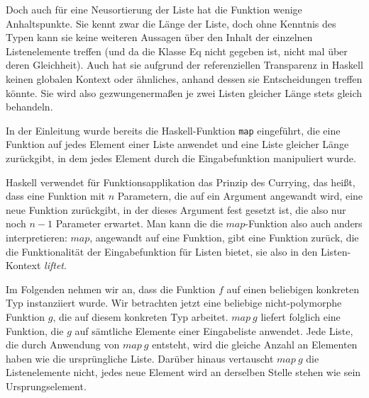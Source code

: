 Doch auch für eine Neusortierung der Liste hat die Funktion wenige Anhaltspunkte. Sie kennt zwar die Länge der Liste, doch ohne Kenntnis des Typen kann sie keine weiteren Aussagen über den Inhalt der einzelnen Listenelemente treffen (und da die Klasse Eq
nicht gegeben ist, nicht mal über deren Gleichheit). Auch hat sie aufgrund der referenziellen Transparenz %
in Haskell keinen globalen Kontext oder ähnliches, anhand dessen sie Entscheidungen treffen könnte.
Sie wird also gezwungenermaßen je zwei Listen gleicher Länge stets gleich behandeln.

In der Einleitung wurde bereits die Haskell-Funktion \texttt{map} eingeführt, die eine Funktion auf jedes Element einer Liste
anwendet und eine Liste gleicher Länge zurückgibt, in dem jedes Element durch die Eingabefunktion manipuliert wurde.


Haskell verwendet für Funktionsapplikation das Prinzip des Currying, das heißt, dass eine Funktion mit $n$ Parametern, die auf ein
Argument angewandt wird, eine neue Funktion zurückgibt, in der dieses Argument fest gesetzt ist, die also nur noch $n-1$ Parameter erwartet. 
Man kann die die $map$-Funktion also auch anders interpretieren: $map$, angewandt auf eine Funktion, gibt eine Funktion zurück, die
die Funktionalität der Eingabefunktion für Listen bietet, sie also in den Listen-Kontext \textit{liftet}.

Im Folgenden nehmen wir an, dass die Funktion $f$ auf einen beliebigen konkreten Typ instanziiert wurde.
Wir betrachten jetzt eine beliebige nicht-polymorphe Funktion $g$, die auf diesem konkreten Typ arbeitet. $map\ g$ liefert folglich eine Funktion,
die $g$ auf sämtliche Elemente einer Eingabeliste
anwendet. Jede Liste, die durch Anwendung von $map\ g$ entsteht, wird die gleiche Anzahl an Elementen haben wie die ursprüngliche Liste.
Darüber hinaus vertauscht $map\ g$ die Listenelemente nicht, jedes neue Element wird an derselben Stelle stehen wie
sein Ursprungselement.

